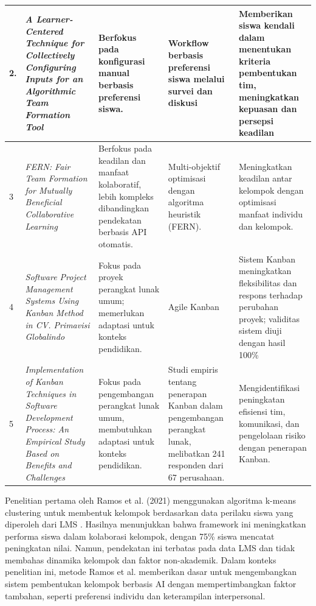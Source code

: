 \begin{longtable}{| b{}|p{}|p{}|p{}|p{}|}
	\hline
	2.           & \textit {A Learner-Centered Technique for Collectively Configuring Inputs for an Algorithmic Team Formation Tool}                 & Berfokus pada konfigurasi manual berbasis preferensi siswa.                                                                                                & Workflow berbasis preferensi siswa melalui survei dan diskusi                                                           & Memberikan siswa kendali dalam menentukan kriteria pembentukan tim, meningkatkan kepuasan dan persepsi keadilan           \\
	\hline
	3            & \textit{FERN: Fair Team Formation for Mutually Beneficial Collaborative Learning}                                                 & Berfokus pada keadilan dan manfaat kolaboratif, lebih kompleks dibandingkan pendekatan berbasis API otomatis.                                              & Multi-objektif optimisasi dengan algoritma heuristik (FERN).                                                            & Meningkatkan keadilan antar kelompok dengan optimisasi manfaat individu dan kelompok.                                     \\
	\hline
	4            & \textit{Software Project Management Systems Using Kanban Method in CV. Primavisi Globalindo}                                      & Fokus pada proyek perangkat lunak umum; memerlukan adaptasi untuk konteks pendidikan.                                                                      & Agile Kanban                                                                                                            & Sistem Kanban meningkatkan fleksibilitas dan respons terhadap perubahan proyek; validitas sistem diuji dengan hasil 100\% \\
	\hline
	5            & \textit{Implementation of Kanban Techniques in Software Development Process: An Empirical Study Based on Benefits and Challenges} & Fokus pada pengembangan perangkat lunak umum, membutuhkan adaptasi untuk konteks pendidikan.                                                               & Studi empiris tentang penerapan Kanban dalam pengembangan perangkat lunak, melibatkan 241 responden dari 67 perusahaan. & Mengidentifikasi peningkatan efisiensi tim, komunikasi, dan pengelolaan risiko dengan penerapan Kanban.                   \\
	\hline
\end{longtable}

Penelitian pertama oleh Ramos et al. (2021) menggunakan algoritma k-means clustering untuk membentuk kelompok berdasarkan data perilaku siswa yang diperoleh dari LMS \cite{Ramos2021}. Hasilnya menunjukkan bahwa framework ini meningkatkan performa siswa dalam kolaborasi kelompok, dengan 75\% siswa mencatat peningkatan nilai. Namun, pendekatan ini terbatas pada data LMS dan tidak membahas dinamika kelompok dan faktor non-akademik. Dalam konteks penelitian ini, metode Ramos et al. memberikan dasar untuk mengembangkan sistem pembentukan kelompok berbasis AI dengan mempertimbangkan faktor tambahan, seperti preferensi individu dan keterampilan interpersonal.

